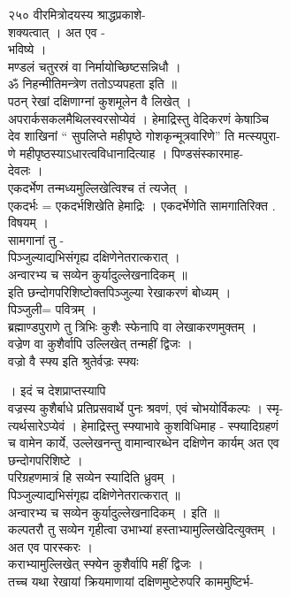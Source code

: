 \documentclass[11pt, openany]{book}
\begin{document}
{{{{{{{{{{{२५० वीरमित्रोदयस्य श्राद्धप्रकाशे-}{\\
शक्यत्वात् । अत एव -\\
भविष्ये ।\\
मण्डलं चतुरस्रं वा निर्मायोच्छिष्टसन्निधौ ।\\
ॐ निहन्मीतिमन्त्रेण ततोऽप्यपहता इति ॥\\
पठन् रेखां दक्षिणाग्नां कुशमूलेन वै लिखेत् ।\\
अपरार्कसकलमैथिलस्वरसोप्येवं । हेमाद्रिस्तु वेदिकरणं केषाञ्चि\\
देव शाखिनां `` सुपलिप्ते महीपृष्ठे गोशकृन्मूत्रवारिणे'' ति मत्स्यपुरा-\\
णे महीपृष्ठस्याऽधारत्वविधानादित्याह । पिण्डसंस्कारमाह-\\
देवलः ।\\
एकदर्भेण तन्मध्यमुल्लिखेत्विश्च तं त्यजेत् ।\\
एकदर्भः = एकदर्भशिखेति हेमाद्रिः । एकदर्भेणेति सामगातिरिक्त .\\
विषयम् ।\\
सामगानां तु -\\
पिञ्जुल्याद्यभिसंगृह्य दक्षिणेनेतरात्करात् ।\\
अन्वारभ्य च सव्येन कुर्यादुल्लेखनादिकम् }{॥}{\\
इति छन्दोगपरिशिष्टोक्तपि}{ञ्जु}{ल्या रेखाकरणं बोध्यम् ।\\
पि}{ञ्जु}{ली= पवित्रम् ।\\
ब्रह्माण्डपुराणे तु त्रिभिः कुशैः स्फेनापि वा लेखाकरणमुक्तम् ।\\
वज्रेण वा कुशैर्वापि उल्लिखेत् तन्महीं द्विजः ।\\
वज्रो वै स्फ्य इति श्रुतेर्वज्रः }{स्फ्यः}{ । इदं च देशप्राप्तस्यापि\\
वज्रस्य कुशैर्बाधे प्रतिप्रसवार्थे पुनः श्रवणं, एवं चोभयोर्विकल्पः ।
स्मृ-\\
त्यर्थसारेऽप्येवं । हेमाद्रिस्तु स्फ्याभावे कुशविधिमाह -
स्फ्यादिग्रहणं\\
च वामेन कार्ये, उल्लेखनन्तु वामान्वारब्धेन दक्षिणेन कार्यम् अत एव\\
छन्दोगपरिशिष्टे ।\\
परिग्रहणमात्रं हि सव्येन स्यादिति ध्रुवम् ।\\
पिञ्जुल्याद्यभिसंगृह्य दक्षिणेनेतरात्करात् ॥\\
अन्वारभ्य च सव्येन कुर्यादुल्लेखनादिकम् । इति ॥\\
कल्पतरौ तु सव्येन गृहीत्वा उभाभ्यां हस्ताभ्यामुल्लिखेदित्युक्तम् ।\\
अत एव पारस्करः ।\\
कराभ्यामुल्लिखेत् स्फ्येन कुशैर्वापि महीं द्विजः ।\\
तच्च यथा रेखायां क्रियमाणायां दक्षिणमुष्टेरुपरि काममुष्टिर्भ-

}}}}}}}}}}}
\end{document}
